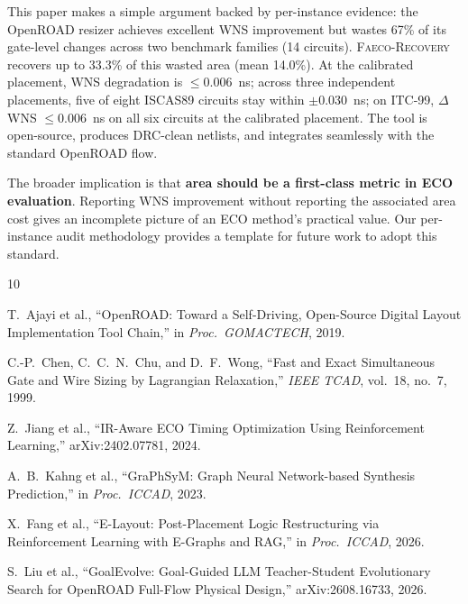 \documentclass[journal]{IEEEtran}
\begin{document}
This paper makes a simple argument backed by per-instance evidence: the
OpenROAD resizer achieves excellent WNS improvement but wastes 67\% of
its gate-level changes across two benchmark families (14 circuits). \textsc{Faeco-Recovery} recovers up to 33.3\% of
this wasted area (mean 14.0\%). At the calibrated placement, WNS degradation is
$\le$0.006~ns; across three independent placements, five of eight ISCAS89 circuits stay within $\pm$0.030~ns; on ITC-99,
$\Delta$WNS $\le$0.006~ns on all six circuits at the calibrated placement. The tool is
open-source, produces DRC-clean netlists, and integrates seamlessly with
the standard OpenROAD flow.

The broader implication is that \textbf{area should be a first-class
metric in ECO evaluation}. Reporting WNS improvement without
reporting the associated area cost gives an incomplete picture of an
ECO method's practical value. Our per-instance audit methodology
provides a template for future work to adopt this standard.


\begin{thebibliography}{10}

T.~Ajayi et al., ``OpenROAD: Toward a Self-Driving, Open-Source
Digital Layout Implementation Tool Chain,'' in \emph{Proc.\ GOMACTECH},
2019.

C.-P.~Chen, C.~C.~N.~Chu, and D.~F.~Wong, ``Fast and Exact Simultaneous
Gate and Wire Sizing by Lagrangian Relaxation,'' \emph{IEEE TCAD},
vol.~18, no.~7, 1999.

Z.~Jiang et al., ``IR-Aware ECO Timing Optimization Using Reinforcement
Learning,'' arXiv:2402.07781, 2024.

A.~B.~Kahng et al., ``GraPhSyM: Graph Neural Network-based Synthesis
Prediction,'' in \emph{Proc.\ ICCAD}, 2023.

X.~Fang et al., ``E-Layout: Post-Placement Logic Restructuring via
Reinforcement Learning with E-Graphs and RAG,'' in \emph{Proc.\ ICCAD},
2026.

S.~Liu et al., ``GoalEvolve: Goal-Guided LLM Teacher-Student
Evolutionary Search for OpenROAD Full-Flow Physical Design,''
arXiv:2608.16733, 2026.

\end{thebibliography}
\end{document}
